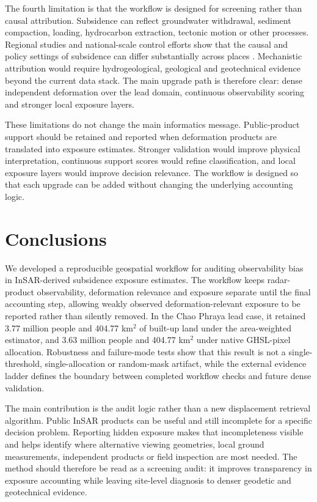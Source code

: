 \documentclass[pdflatex,sn-mathphys-ay]{sn-jnl}
\begin{document}
The fourth limitation is that the workflow is designed for screening rather than causal attribution. Subsidence can reflect groundwater withdrawal, sediment compaction, loading, hydrocarbon extraction, tectonic motion or other processes. Regional studies and national-scale control efforts show that the causal and policy settings of subsidence can differ substantially across places \citep{ao2024national,fang2022subsidencecontrol}. Mechanistic attribution would require hydrogeological, geological and geotechnical evidence beyond the current data stack. The main upgrade path is therefore clear: dense independent deformation over the lead domain, continuous observability scoring and stronger local exposure layers.

These limitations do not change the main informatics message. Public-product support should be retained and reported when deformation products are translated into exposure estimates. Stronger validation would improve physical interpretation, continuous support scores would refine classification, and local exposure layers would improve decision relevance. The workflow is designed so that each upgrade can be added without changing the underlying accounting logic.

\section{Conclusions}

We developed a reproducible geospatial workflow for auditing observability bias in InSAR-derived subsidence exposure estimates. The workflow keeps radar-product observability, deformation relevance and exposure separate until the final accounting step, allowing weakly observed deformation-relevant exposure to be reported rather than silently removed. In the Chao Phraya lead case, it retained 3.77 million people and 404.77 km$^2$ of built-up land under the area-weighted estimator, and 3.63 million people and 404.77 km$^2$ under native GHSL-pixel allocation. Robustness and failure-mode tests show that this result is not a single-threshold, single-allocation or random-mask artifact, while the external evidence ladder defines the boundary between completed workflow checks and future dense validation.

The main contribution is the audit logic rather than a new displacement retrieval algorithm. Public InSAR products can be useful and still incomplete for a specific decision problem. Reporting hidden exposure makes that incompleteness visible and helps identify where alternative viewing geometries, local ground measurements, independent products or field inspection are most needed. The method should therefore be read as a screening audit: it improves transparency in exposure accounting while leaving site-level diagnosis to denser geodetic and geotechnical evidence.
\end{document}
